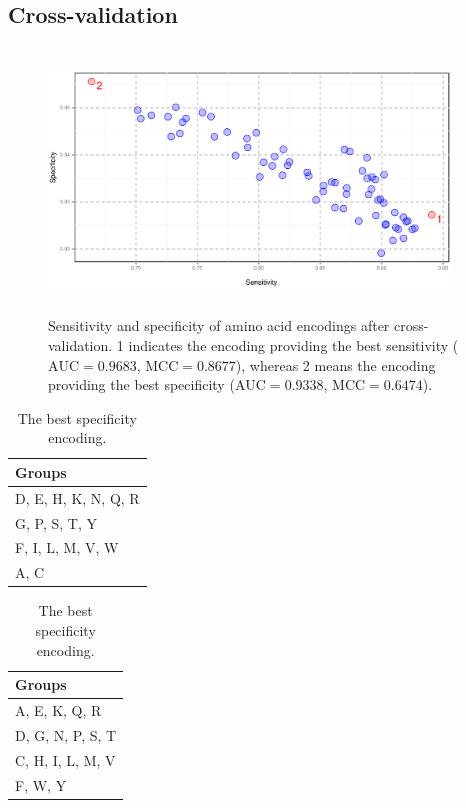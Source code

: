 \documentclass[10pt,letterpaper]{article}
\begin{document}
\subsection*{Cross-validation}

\begin{figure}[ht]\centering
\includegraphics[width=0.95\textwidth, height=7cm]{figures/cvres.eps}
\caption{Sensitivity and specificity of amino acid encodings after cross-validation. 1 indicates the encoding providing the best sensitivity ($\textrm{AUC} = 0.9683$, $\textrm{MCC} = 0.8677$), whereas 2 means the encoding providing the best specificity ($\textrm{AUC} = 0.9338$, $\textrm{MCC} = 0.6474$).}
\label{fig:cvres}
\end{figure}

\begin{table}[ht]
\small
\begin{minipage}{.5\linewidth} 
\centering
\caption{The best sensitivity (final) encoding.} 
\begin{tabular}{l}
  \toprule
Groups \\ 
  \midrule
D, E, H, K, N, Q, R \\ 
   \rowcolor[gray]{0.85}G, P, S, T, Y \\ 
  F, I, L, M, V, W \\ 
   \rowcolor[gray]{0.85}A, C \\ 
   \bottomrule
\end{tabular}
\label{tab:best}
\end{minipage}
\begin{minipage}{.5\linewidth} 
\centering
\caption{The best specificity encoding.} 
\begin{tabular}{l}
  \toprule
Groups \\ 
  \midrule
A, E, K, Q, R \\ 
   \rowcolor[gray]{0.85}D, G, N, P, S, T \\ 
  C, H, I, L, M, V \\ 
   \rowcolor[gray]{0.85}F, W, Y \\ 
   \bottomrule
\end{tabular}
\label{tab:worst}
\end{minipage}
\end{table}
\end{document}

